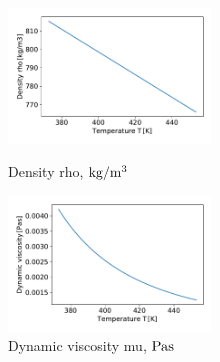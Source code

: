 \documentclass[conference]{IEEEtran}
\begin{document}
\begin{figure}[h]
\vspace{3zh}
\begin{minipage}{0.48\linewidth}
 \includegraphics[width=0.48\textwidth,natwidth=200,natheight=220]{fig/density_rho.pdf}
 \vspace{-1.5zh}
 \caption{Density rho, $\rm kg/m^{3}$}\label{density_rho}
\end{minipage}
\hfill
\begin{minipage}{0.48\linewidth}
 \includegraphics[width=0.48\textwidth,natwidth=190,natheight=210]{fig/dynamic_viscosity.pdf}
 \vspace{-1.5zh}
 \caption{Dynamic viscosity mu, $\rm Pa s$}\label{dynamic_viscosity}
\end{minipage}
\vspace{2zh}
\end{figure}
\end{document}
